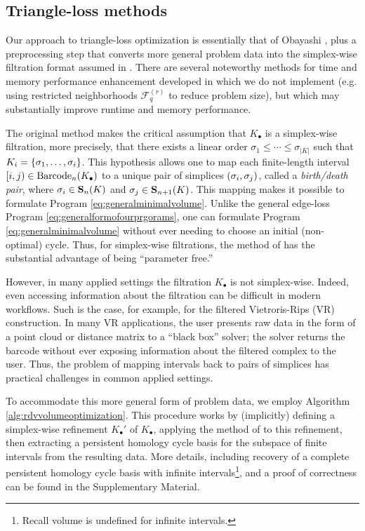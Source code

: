 \subsection{Triangle-loss methods}
\label{sec:trianglelossmethdos}

Our approach to triangle-loss optimization is essentially that of Obayashi \cite{Obayashi2018}, plus a preprocessing step that converts more general problem data into the simplex-wise filtration format assumed in \cite{Obayashi2018}.  There are several noteworthy methods for time and memory performance enhancement developed in \cite{Obayashi2018}  which we do not implement (e.g.  using restricted neighborhoods $\mathcal{F}_q^{(r)}$ to reduce problem size), but which may substantially improve runtime and memory performance.

The original method makes the critical assumption that $K_\bullet$ is a simplex-wise filtration, more precisely, that there exists a linear order $\sigma_1 \le \cdots \le \sigma_{|K|}$ such that $K_i = \{\sigma_1, \ldots, \sigma_i\}$. This hypothesis allows one to map each finite-length interval $[i,j) \in \mathrm{Barcode}_n(K_\bullet)$ to a unique pair of simplices $(\sigma_i, \sigma_j)$, called a \emph{birth/death pair}, where  $\sigma_i \in \mathbf{S}_n(K)$ and $\sigma_j \in \mathbf{S}_{n+1}(K)$.    This mapping makes it possible to formulate Program \eqref{eq:generalminimalvolume}. Unlike the general edge-loss Program \eqref{eq:generalformofourprgorams}, one can formulate Program \eqref{eq:generalminimalvolume} without ever needing to choose an initial (non-optimal) cycle.  Thus, for simplex-wise filtrations, the method of \cite{Obayashi2018} has the substantial advantage of being ``parameter free.''

 
However, in many applied settings the filtration $K_\bullet$ is not simplex-wise.   Indeed, even accessing information about the filtration can be difficult in modern workflows.  Such is the case, for example, for the filtered Vietroris-Rips (VR) construction. In many VR applications, the user  presents raw data in the form of a point cloud or distance matrix to a ``black box'' solver; the solver returns the barcode without ever exposing information about the filtered complex to the user. Thus, the problem of mapping intervals back to pairs of simplices has practical challenges in common applied settings.




 
To accommodate this more general form of problem data, we employ Algorithm \ref{alg:rdvvolumeoptimization}.  This procedure works by (implicitly) defining a simplex-wise refinement $K_\bullet'$ of $K_\bullet$, applying the method of \cite{Obayashi2018} to this refinement, then extracting a persistent homology cycle basis for the subspace of finite intervals from the resulting data.
 More details, including recovery of a complete persistent homology cycle basis with infinite intervals\footnote{Recall volume is undefined for infinite intervals.}, and a proof of correctness can be found in the Supplementary Material.

